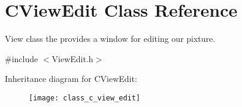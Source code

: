 \hypertarget{class_c_view_edit}{\section{C\+View\+Edit Class Reference}
\label{class_c_view_edit}
}


View class the provides a window for editing our pixture.  




{\ttfamily \#include $<$View\+Edit.\+h$>$}

Inheritance diagram for C\+View\+Edit\+:\begin{figure}[H]
\begin{center}
\leavevmode
\texttt{[image: class\_c\_view\_edit]}
\end{center}
\end{figure}
